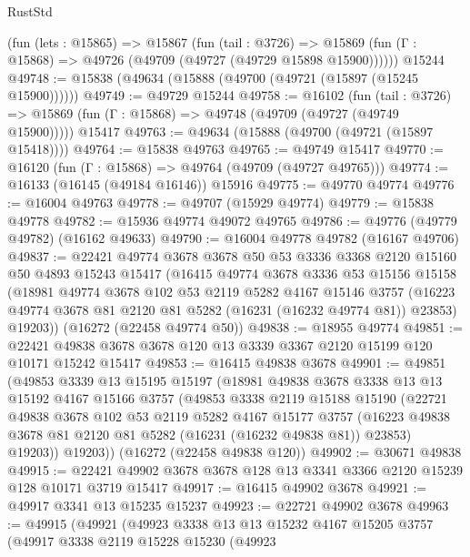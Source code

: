 \begin{lexlean}{RustStd}
\begin{coremodule}
    (fun (lets : @15865) =>
    @15867
      (fun (tail : @3726) =>
      @15869 (fun (Γ : @15868) => @49726 (@49709 (@49727 (@49729 @15898 @15900))))))
    @15244
@49748 := @15838 (@49634 (@15888 (@49700 (@49721 (@15897 (@15245 @15900))))))
@49749 := @49729 @15244
@49758 := @16102
    (fun (tail : @3726) => @15869 (fun (Γ : @15868) => @49748 (@49709 (@49727 (@49749 @15900)))))
    @15417
@49763 := @49634 (@15888 (@49700 (@49721 (@15897 @15418))))
@49764 := @15838 @49763
@49765 := @49749 @15417
@49770 := @16120 (fun (Γ : @15868) => @49764 (@49709 (@49727 @49765)))
@49774 := @16133 (@16145 (@49184 @16146)) @15916
@49775 := @49770 @49774
@49776 := @16004 @49763
@49778 := @49707 (@15929 @49774)
@49779 := @15838 @49778
@49782 := @15936 @49774 @49072 @49765
@49786 := @49776 (@49779 @49782) (@16162 @49633)
@49790 := @16004 @49778 @49782 (@16167 @49706)
@49837 := @22421
    @49774
    @3678
    @3678
    @50
    @53
    @3336
    @3368
    @2120
    @15160
    @50
    @4893
    @15243
    @15417
    (@16415
      @49774
      @3678
      @3336
      @53
      @15156
      @15158
      (@18981
        @49774
        @3678
        @102
        @53
        @2119
        @5282
        @4167
        @15146
        @3757
        (@16223 @49774 @3678 @81 @2120 @81 @5282 (@16231 (@16232 @49774 @81)) @23853)
        @19203))
    (@16272 (@22458 @49774 @50))
@49838 := @18955 @49774
@49851 := @22421 @49838 @3678 @3678 @120 @13 @3339 @3367 @2120 @15199 @120 @10171 @15242 @15417
@49853 := @16415 @49838 @3678
@49901 := @49851
    (@49853
      @3339
      @13
      @15195
      @15197
      (@18981
        @49838
        @3678
        @3338
        @13
        @13
        @15192
        @4167
        @15166
        @3757
        (@49853
          @3338
          @2119
          @15188
          @15190
          (@22721
            @49838
            @3678
            @102
            @53
            @2119
            @5282
            @4167
            @15177
            @3757
            (@16223 @49838 @3678 @81 @2120 @81 @5282 (@16231 (@16232 @49838 @81)) @23853)
            @19203))
        @19203))
    (@16272 (@22458 @49838 @120))
@49902 := @30671 @49838
@49915 := @22421 @49902 @3678 @3678 @128 @13 @3341 @3366 @2120 @15239 @128 @10171 @3719 @15417
@49917 := @16415 @49902 @3678
@49921 := @49917 @3341 @13 @15235 @15237
@49923 := @22721 @49902 @3678
@49963 := @49915
    (@49921
      (@49923
        @3338
        @13
        @13
        @15232
        @4167
        @15205
        @3757
        (@49917
          @3338
          @2119
          @15228
          @15230
          (@49923

\end{coremodule}
\end{lexlean}
